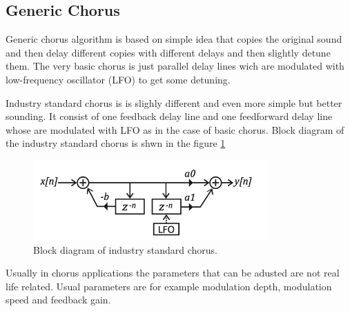 \subsection{Generic Chorus}

Generic chorus algorithm is based on simple idea that copies the original sound and then delay
different copies with different delays and then slightly detune them. The very basic chorus is just
parallel delay lines wich are modulated with low-frequency oscillator (LFO) to get some detuning.

Industry standard chorus is is slighly different and even more simple but better sounding. It consist
of one feedback delay line and one feedforward delay line whose are modulated with LFO as in the 
case of basic chorus. Block diagram of the industry standard chorus is shwn in the figure \ref{fig:inds}
\begin{figure}[ht]
\centering
\includegraphics[width = 9cm]{industryStd.png}
\caption{Block diagram of industry standard chorus. \cite{dudas}}
\label{fig:inds}
\end{figure} 

Usually in chorus applications the parameters that can be adusted are not real life related.
Usual parameters are for example modulation depth, modulation speed and feedback gain.
